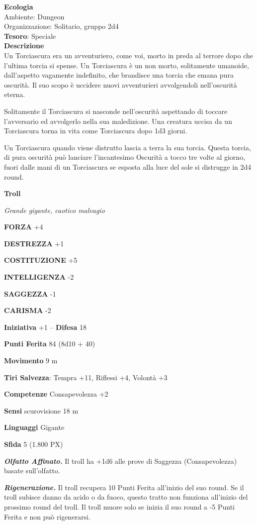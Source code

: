 \begin{multicols}{2}
	\textbf{Ecologia}\\
	Ambiente: Dungeon\\
	Organizzazione: Solitario, gruppo 2d4\\
	\textbf{Tesoro}: Speciale\\
	\textbf{Descrizione}\\
	Un Torciascura era un avventuriero, come voi, morto in preda al terrore dopo che l'ultima torcia si spense. Un Torciascura è un non morto, solitamente umanoide, dall'aspetto vagamente indefinito, che brandisce una torcia che emana pura oscurità. Il suo scopo è uccidere nuovi avventurieri avvolgendoli nell'oscurità eterna.

	Solitamente il Torciascura si nasconde nell'oscurità aspettando di toccare l'avversario ed avvolgerlo nella sua maledizione. Una creatura uccisa da un Torciascura torna in vita come Torciascura dopo 1d3 giorni.

	Un Torciascura quando viene distrutto lascia a terra la sua torcia. Questa torcia, di pura oscurità può lanciare l'incantesimo Oscurità a tocco tre volte al giorno, fuori dalle mani di un Torciascura se esposta alla luce del sole si distrugge in 2d4 round.


	\medskip{}\textbf{Troll}

	\textit{Grande gigante, caotico malvagio}

	\textbf{FORZA} +4

	\textbf{DESTREZZA} +1

	\textbf{COSTITUZIONE} +5

	\textbf{INTELLIGENZA} -2

	\textbf{SAGGEZZA} -1

	\textbf{CARISMA} -2

	\textbf{Iniziativa} +1 -- \textbf{Difesa} 18

	\textbf{Punti Ferita} 84 (8d10 + 40)

	\textbf{Movimento} 9 m

	\textbf{Tiri Salvezza}: Tempra +11, Riflessi +4, Volontà +3

	\textbf{Competenze} Consapevolezza +2

	\textbf{Sensi} scurovisione 18 m

	\textbf{Linguaggi} Gigante

	\textbf{Sfida} 5 (1.800 PX)

	\textit{\textbf{Olfatto Affinato.}} Il troll ha +1d6 alle prove di Saggezza (Consapevolezza) basate sull'olfatto.

	\textit{\textbf{Rigenerazione.}} Il troll recupera 10 Punti Ferita all'inizio del suo round. Se il troll subisce danno da acido o da fuoco, questo tratto non funziona all'inizio del prossimo round del troll. Il troll muore solo se inizia il suo round a -5 Punti Ferita e non può rigenerarsi.


\end{multicols}
